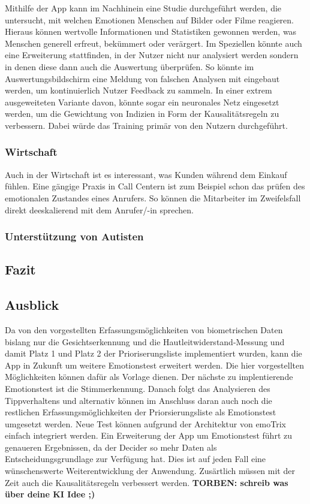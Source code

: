 Mithilfe der App kann im Nachhinein eine Studie durchgeführt werden, die untersucht, mit welchen Emotionen Menschen auf Bilder oder Filme reagieren. Hieraus können wertvolle Informationen und Statistiken gewonnen werden, was Menschen generell erfreut, bekümmert oder verärgert. \newline
Im Speziellen könnte auch eine Erweiterung stattfinden, in der Nutzer nicht nur analysiert werden sondern in denen diese dann auch die Auswertung überprüfen. So könnte im Auswertungsbildschirm eine Meldung von falschen Analysen mit eingebaut werden, um kontinuierlich Nutzer Feedback zu sammeln. In einer extrem ausgeweiteten Variante davon, könnte sogar ein neuronales Netz eingesetzt werden, um die Gewichtung von Indizien in Form der Kausalitätsregeln zu verbessern. Dabei würde das Training primär von den Nutzern durchgeführt. 
\subsubsection{Wirtschaft}
Auch in der Wirtschaft ist es interessant, was Kunden während dem Einkauf fühlen. Eine gängige Praxis in Call Centern ist zum Beispiel schon das prüfen des emotionalen Zustandes eines Anrufers. So können die Mitarbeiter im Zweifelsfall direkt deeskalierend mit dem Anrufer/-in sprechen.
\subsubsection{Unterstützung von Autisten}
\subsection{Fazit}
\subsection{Ausblick}
Da von den vorgestellten Erfassungsmöglichkeiten von biometrischen Daten bislang nur die Gesichtserkennung und die Hautleitwiderstand-Messung und damit Platz 1 und Platz 2 der Prioriserungsliste implementiert wurden, kann die App in Zukunft um weitere Emotionstest erweitert werden. Die hier vorgestellten Möglichkeiten können dafür als Vorlage dienen. Der nächste zu implentierende Emotionstest ist die Stimmerkennung. Danach folgt das Analysieren des Tippverhaltens und alternativ können im Anschluss daran auch noch die restlichen Erfassungsmöglichkeiten der Priorsierungsliste als Emotionstest umgesetzt werden. Neue Test können aufgrund der Architektur von emoTrix einfach integriert werden. \newline
Ein Erweiterung der App um Emotionstest führt zu genaueren Ergebnissen, da der Decider so mehr Daten als Entscheidungsgrundlage zur Verfügung hat. Dies ist auf jeden Fall eine wünschenswerte Weiterentwicklung der Anwendung.\newline
Zusärtlich müssen mit der Zeit auch die Kausalitätsregeln verbessert werden. \textbf{TORBEN: schreib was über deine KI Idee ;)} 
